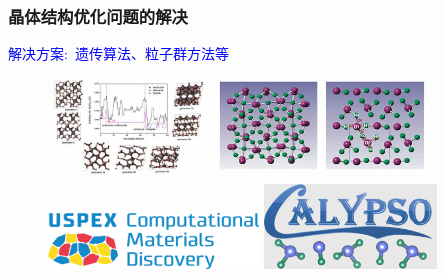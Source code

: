 \documentclass[cjk,slidestop,compress,mathserif,blue]{beamer}
\begin{document}
\frame
{
	\frametitle{晶体结构优化问题的解决}
	\textcolor{blue}{解决方案:~遗传算法、粒子群方法等}
\begin{figure}[h!]
\centering
\includegraphics[height=1.0in,width=1.7in]{Figures/Struct-predict-1.png}
\includegraphics[height=1.0in,width=2.2in]{Figures/Struct-predict-2.png}
\vskip 8.0pt
\includegraphics[height=0.7in,width=2.2in]{Figures/Logo_USPEX.png}
\hskip 1.0pt
\includegraphics[height=1.0in,width=1.8in]{Figures/Logo_Calypso.png}
\label{Fig:Structure-optimized-2}
\end{figure}
}
\end{document}
